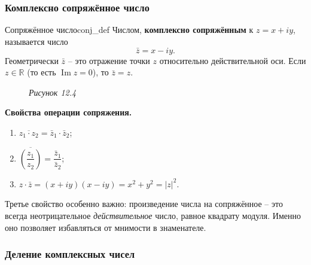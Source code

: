 \documentclass[12pt,a4paper]{article}
\begin{document}
\subsubsection*{Комплексно сопряжённое число}

\begin{definition}{Сопряжённое число}{conj_def}
  Числом, \textbf{комплексно сопряжённым} к $z = x + iy$, называется
  число
  \[
    \bar{z} = x - iy.
  \]
  Геометрически $\bar{z}$ -- это отражение точки $z$ относительно
  действительной оси. Если $z \in \mathbb{R}$ (то есть
  $\operatorname{Im} z = 0$), то $\bar{z} = z$.
\end{definition}

\begin{figure}[H]
  \centering

  \smallskip
  \textit{Рисунок 12.4}
\end{figure}

\noindent\textbf{Свойства операции сопряжения.}
\begin{enumerate}
  \item $\overline{z_1 \cdot z_2} = \bar{z}_1 \cdot \bar{z}_2$;
  \item $\overline{\left(\dfrac{z_1}{z_2}\right)}
    = \dfrac{\bar{z}_1}{\bar{z}_2}$;
  \item $z \cdot \bar{z} = (x + iy)(x - iy) = x^2 + y^2 = |z|^2$.
\end{enumerate}

Третье свойство особенно важно: произведение числа на сопряжённое --
это всегда неотрицательное \emph{действительное} число, равное квадрату
модуля. Именно оно позволяет избавляться от мнимости в знаменателе.

\subsubsection*{Деление комплексных чисел}
\end{document}
